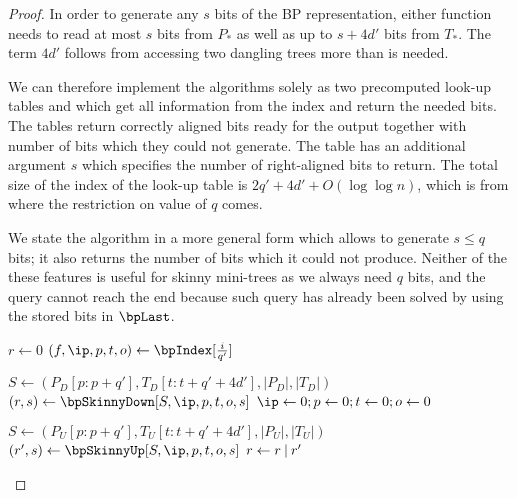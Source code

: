 \begin{proof}
	In order to generate any $s$ bits of the BP representation, either function needs to read at most $s$ bits from $P_*$ as well as up to $s + 4d'$ bits from $T_*$.
	The term $4d'$ follows from accessing two dangling trees more than is needed.
	
	We can therefore implement the algorithms solely as two precomputed look-up tables \bpSkinnyDown{} and \bpSkinnyUp{} which get all information from the index and return the needed bits.
	The tables return correctly aligned bits ready for the output together with number of bits which they could not generate.
	The table has an additional argument $s$ which specifies the number of right-aligned bits to return.
	The total size of the index of the look-up table is $2q' + 4d' + O(\log \log n)$, which is from where the restriction on value of $q$ comes.
	
	We state the algorithm in a more general form which allows to generate $s \le q$ bits; it also returns the number of bits which it could not produce.
	Neither of the these features is useful for skinny mini-trees as we always need $q$ bits, and the query cannot reach the end because such query has already been solved by using the stored bits in $\bpLast$.
	
	\begin{algorithm}
	\begin{algorithmic}
		\State $r \gets 0$ 
		\State $(f, \ip, p, t, o) \gets \bpIndex[\frac{i}{q'}]$
		
		 
			\State $S \gets (P_D[p:p+q'], T_D[t:t + q' + 4d'], |P_D|, |T_D|)$
			\State $(r, s) \gets \bpSkinnyDown[S, \ip, p, t, o, s]$
			\State $\ip \gets 0; p \gets 0; t \gets 0; o \gets 0$
		\EndIf
		
		 
			\State $S \gets (P_U[p:p+q'], T_U[t:t + q' + 4d'], |P_U|, |T_U|)$
			\State $(r', s) \gets \bpSkinnyUp[S, \ip, p, t, o, s]$
			\State $r \gets r \mathbin{|} r'$ 
		\EndIf
		
		\State {}
	\EndFunction
	\end{algorithmic}
	\end{algorithm}
\end{proof}

